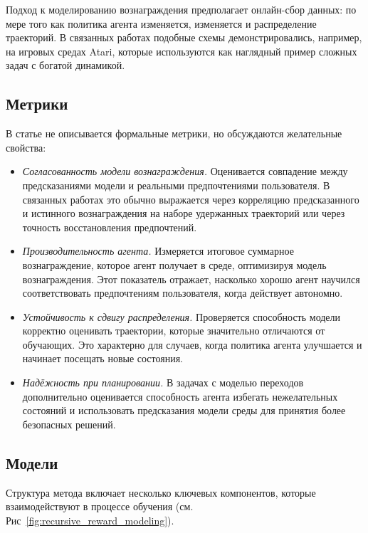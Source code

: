 Подход к моделированию вознаграждения предполагает онлайн-сбор данных: 
по мере того как политика агента изменяется, изменяется и распределение 
траекторий. В связанных работах подобные схемы демонстрировались, например, 
на игровых средах Atari, которые используются как наглядный пример 
сложных задач с богатой динамикой.


\subsection{Метрики}

В статье не описывается формальные метрики, но обсуждаются желательные свойства:

\begin{itemize}
\item \emph{Согласованность модели вознаграждения.}  
Оценивается совпадение между предсказаниями модели и реальными 
предпочтениями пользователя. В связанных работах это обычно выражается 
через корреляцию предсказанного и истинного вознаграждения на наборе 
удержанных траекторий или через точность восстановления предпочтений.

\item \emph{Производительность агента.}  
Измеряется итоговое суммарное вознаграждение, которое агент получает 
в среде, оптимизируя модель вознаграждения. Этот показатель отражает, 
насколько хорошо агент научился соответствовать предпочтениям 
пользователя, когда действует автономно.

\item \emph{Устойчивость к сдвигу распределения.}  
Проверяется способность модели корректно оценивать траектории, которые 
значительно отличаются от обучающих. Это характерно для случаев, когда 
политика агента улучшается и начинает посещать новые состояния.

\item \emph{Надёжность при планировании.}  
В задачах с моделью переходов дополнительно оценивается способность агента 
избегать нежелательных состояний и использовать предсказания модели среды 
для принятия более безопасных решений.
\end{itemize}

\subsection{Модели}

Структура метода включает несколько ключевых компонентов, которые 
взаимодействуют в процессе обучения (см. Рис~\ref{fig:recursive_reward_modeling}).


